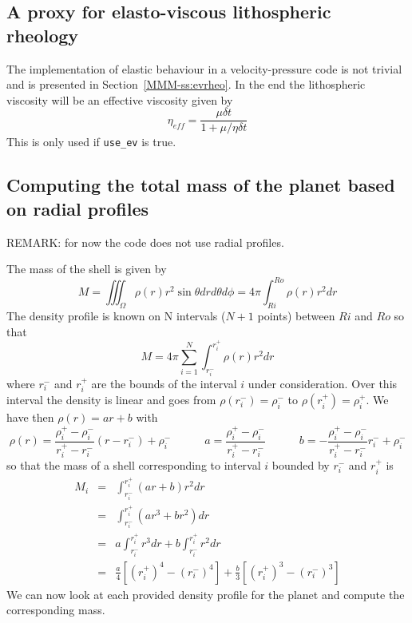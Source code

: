 \subsection*{A proxy for elasto-viscous lithospheric rheology}

The implementation of elastic behaviour in a velocity-pressure code is not trivial 
and is presented in Section~\ref{MMM-ss:evrheo}.
In the end the lithospheric viscosity will be an effective viscosity given by
\[
\eta_{eff} = \frac{\mu \delta t}{1+\mu/\eta \delta t} 
\]
This is only used if \texttt{use\_ev} is true.

\subsection*{Computing the total mass of the planet based on radial profiles}

REMARK: for now the code does not use radial profiles.


The mass of the shell is given by
\[
M= \iiint_\Omega \rho(r) r^2 \sin\theta dr d\theta d\phi
= 4\pi \int_{Ri}^{Ro} \rho(r) r^2 dr
\]
The density profile is known on N intervals ($N+1$ points) between $Ri$ and $Ro$ so that 
\[
M = 4\pi \sum_{i=1}^N \int_{r_i^-}^{r_i^+} \rho(r) r^2 dr
\]
where $r_i^-$ and $r_i^+$ are the bounds of the interval $i$
under consideration.
Over this interval the density is linear and goes from $\rho(r_i^-)=\rho_i^-$ to $\rho(r_i^+)=\rho_i^+$. 
We have then $\rho(r)=ar+b$ with 
\[
\rho(r) = \frac{\rho_i^+-\rho_i^-}{r_i^+-r_i^-}(r-r_i^-)+\rho_i^-
\qquad\quad
a= \frac{\rho_i^+-\rho_i^-}{r_i^+-r_i^-}
\qquad\quad
b=-\frac{\rho_i^+-\rho_i^-}{r_i^+-r_i^-}r_i^- + \rho_i^-
\]
so that the mass of a shell corresponding to interval $i$ 
bounded by $r_i^-$ and $r_i^+$ is
\begin{eqnarray}
M_i 
&=& \int_{r_i^-}^{r_i^+} (ar+b)r^2 dr  \nonumber\\
&=& \int_{r_i^-}^{r_i^+} (ar^3+br^2) dr  \nonumber\\
&=& a\int_{r_i^-}^{r_i^+} r^3 dr 
+b\int_{r_i^-}^{r_i^+} r^2 dr \nonumber\\
&=& \frac{a}{4} \left[ (r_i^+)^4 -(r_i^-)^4  \right]
+\frac{b}{3} \left[ (r_i^+)^3 -(r_i^-)^3 \right]
\end{eqnarray}
We can now look at each provided density profile for the planet and
compute the corresponding mass.


